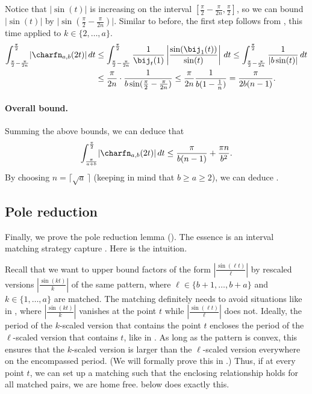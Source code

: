 \documentclass{toc}
\begin{document}
Notice that $\lvert\sin(t)\rvert$ is increasing on the interval $[\frac{\pi}{2}-\frac{\pi}{2n},\frac{\pi}{2}]$, so we can bound $\lvert\sin(t)\rvert$ by $\lvert\sin(\frac{\pi}{2}-\frac{\pi}{2n})\rvert$. Similar to before, the first step follows from , this time applied to $k \in \{2,\dots,a\}$. 
\begin{align*}
    \int_{\frac{\pi}{2}-\frac{\pi}{2n}}^{\frac{\pi}{2}} \lvert\charfn_{a,b}(2t)\rvert\,dt 
    &\le \int_{\frac{\pi}{2}-\frac{\pi}{2n}}^{\frac{\pi}{2}} \frac{1}{\bij_t(1)} \left\lvert\frac{\sin(\bij_1(t))}{\sin(t)}\right\rvert\,dt
    \le \int_{\frac{\pi}{2}-\frac{\pi}{2n}}^{\frac{\pi}{2}} \frac{1}{|b \sin(t)|}\,dt\\
    &\le \frac{\pi}{2n}\cdot \frac{1}{b\sin(\frac{\pi}{2}-\frac{\pi}{2n})}
    \le \frac{\pi}{2n}\frac{1}{b(1-\frac{1}{n})}
    = \frac{\pi}{2b(n-1)}.
\end{align*}

\paragraph{Overall bound.}

Summing the above bounds, we can deduce that
\[\int_{\frac{\pi}{a+b}}^{\frac{\pi}{2}} \lvert\charfn_{a,b}(2t)\rvert\,dt \le \frac{\pi}{b(n-1)}+\frac{\pi n}{b^2}.  \]
By choosing $n=\lceil\sqrt{a} \,\rceil$ (keeping in mind that $b\ge a \ge 2$), we can deduce .

\subsection{Pole reduction}
\label{sec:pole-reduction}

Finally, we prove the pole reduction lemma (). The essence is an interval matching strategy capture . Here is the intuition. 

Recall that we want to upper bound factors of the form $|\frac{\sin(\ell t)}{\ell}|$ by rescaled versions $|\frac{\sin(k t)}{k}|$ of the same pattern, where $\ell \in \{b+1,\dots,b+a\}$ and $k \in \{1,\dots,a\}$ are matched. The matching definitely needs to avoid situations like in , where $|\frac{\sin(kt)}{k}|$ vanishes at the point $t$ while $|\frac{\sin(\ell t)}{\ell}|$ does not. Ideally, the period of the $k$-scaled version that contains the point $t$ encloses the period of the $\ell$-scaled version that contains $t$, like in . As long as the pattern is convex, this ensures that the $k$-scaled version is larger than the $\ell$-scaled version everywhere on the encompassed period. (We will formally prove this in .) Thus, if at every point $t$, we can set up a matching such that the enclosing relationship holds for all matched pairs, we are home free.  below does exactly this.
\end{document}
